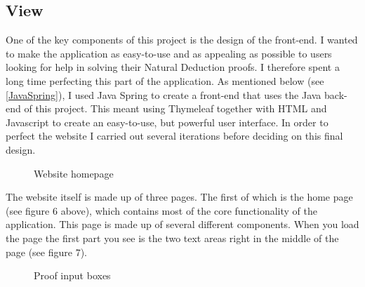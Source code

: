 \pagebreak
\subsection{View \label{view}}

One of the key components of this project is the design of the front-end. I wanted to make the application as easy-to-use and as appealing as possible to users looking for help in solving their Natural Deduction proofs. I therefore spent a long time perfecting this part of the application. As mentioned below (see \ref{JavaSpring}), I used Java Spring to create a front-end that uses the Java back-end of this project. This meant using Thymeleaf together with HTML and Javascript to create an easy-to-use, but powerful user interface. In order to perfect the website I carried out several iterations before deciding on this final design.

\begin{figure}[!ht]
	\centering
	\caption{Website homepage}
\end{figure}

The website itself is made up of three pages. The first of which is the home page (see figure 6 above), which contains most of the core functionality of the application. This page is made up of several different components. When you load the page the first part you see is the two text areas right in the middle of the page (see figure 7). 

\begin{figure}[!ht]
	\centering
	\caption{Proof input boxes}
\end{figure}


